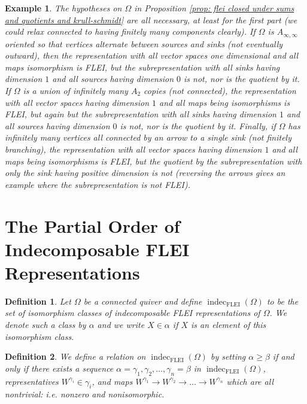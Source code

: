 \documentclass{article}
\newtheorem{definition}{Definition}
\newtheorem{example}{Example}[section]
\begin{document}
\begin{example}
The hypotheses on $\Omega$ in Proposition \ref{prop: flei closed under sums and quotients and krull-schmidt} are all necessary, at least for the first part (we could relax connected to having finitely many components clearly). If $\Omega$ is $A_{\infty,\infty}$ oriented so that vertices alternate between sources and sinks (not eventually outward), then the representation with all vector spaces one dimensional and all maps isomorphism is FLEI, but the subrepresentation with all sinks having dimension $1$ and all sources having dimension $0$ is not, nor is the quotient by it.  If $\Omega$ is a union of infinitely many $A_2$ copies (not connected), the representation with all vector spaces having dimension $1$ and all maps being isomorphisms is FLEI, but again but the subrepresentation with all sinks having dimension $1$ and all sources having dimension $0$ is not, nor is the quotient by it.  Finally, if $\Omega$ has infinitely many vertices all connected by an arrow to a single sink (not finitely branching), the representation  with all vector spaces having dimension $1$ and all maps being isomorphisms is FLEI, but the quotient by the subrepresentation with only the sink having positive dimension is not (reversing the arrows gives an example where the subrepresentation is not FLEI).  



\end{example}





\section{The Partial Order of Indecomposable FLEI Representations} \label{sec: partial order}



\begin{definition}
    Let $\Omega$ be a connected quiver and define $\operatorname{indec}_\text{FLEI}(\Omega)$ to be the set of isomorphism classes of indecomposable FLEI representations of $\Omega$. We denote such a class by $\alpha$ and we write $X \in \alpha$ if $X$ is an element of this isomorphism class.
\end{definition}

\begin{definition}\label{def: partial order on indecomposables}
  We define a relation on $\operatorname{indec}_\text{FLEI}(\Omega)$ by setting $\alpha \geq \beta$ if and only if there exists a sequence $\alpha = \gamma_1, \gamma_2, \ldots, \gamma_n = \beta$ in $\operatorname{indec}_\text{FLEI}(\Omega)$, representatives $W^{\gamma_i} \in \gamma_i$, and maps $W^{\gamma_1} \to W^{\gamma_2} \to \ldots \to W^{\gamma_n}$ which are all nontrivial: i.e. nonzero and nonisomorphic. 
\end{definition}
\end{document}
